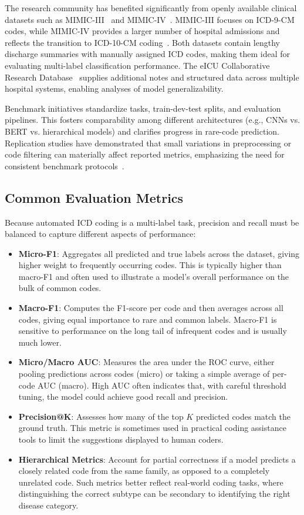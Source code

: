 The research community has benefited significantly from openly available clinical datasets such as MIMIC-III~\citep{johnson2016mimic} and MIMIC-IV~\citep{johnson2023mimicivscidata}. MIMIC-III focuses on ICD-9-CM codes, while MIMIC-IV provides a larger number of hospital admissions and reflects the transition to ICD-10-CM coding~\citep{nguyen2023mimicivicd}. Both datasets contain lengthy discharge summaries with manually assigned ICD codes, making them ideal for evaluating multi-label classification performance. The eICU Collaborative Research Database~\citep{pollard2018eicu} supplies additional notes and structured data across multiple hospital systems, enabling analyses of model generalizability.

Benchmark initiatives standardize tasks, train-dev-test splits, and evaluation pipelines. This fosters comparability among different architectures (e.g., CNNs vs. BERT vs. hierarchical models) and clarifies progress in rare-code prediction. Replication studies have demonstrated that small variations in preprocessing or code filtering can materially affect reported metrics, emphasizing the need for consistent benchmark protocols~\citep{edin2023automated}.

\subsection{Common Evaluation Metrics}

Because automated ICD coding is a multi-label task, precision and recall must be balanced to capture different aspects of performance:

\begin{itemize}
    \item \textbf{Micro-F1}: Aggregates all predicted and true labels across the dataset, giving higher weight to frequently occurring codes. This is typically higher than macro-F1 and often used to illustrate a model’s overall performance on the bulk of common codes.
    \item \textbf{Macro-F1}: Computes the F1-score per code and then averages across all codes, giving equal importance to rare and common labels. Macro-F1 is sensitive to performance on the long tail of infrequent codes and is usually much lower.
    \item \textbf{Micro/Macro AUC}: Measures the area under the ROC curve, either pooling predictions across codes (micro) or taking a simple average of per-code AUC (macro). High AUC often indicates that, with careful threshold tuning, the model could achieve good recall and precision.
    \item \textbf{Precision@K}: Assesses how many of the top \(K\) predicted codes match the ground truth. This metric is sometimes used in practical coding assistance tools to limit the suggestions displayed to human coders.
    \item \textbf{Hierarchical Metrics}: Account for partial correctness if a model predicts a closely related code from the same family, as opposed to a completely unrelated code. Such metrics better reflect real-world coding tasks, where distinguishing the correct subtype can be secondary to identifying the right disease category.
\end{itemize}

